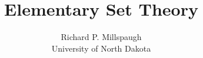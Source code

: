 \documentclass[12pt]{book}
\title{Elementary Set Theory}
\author{Richard P. Millspaugh\\University of North Dakota}
\date{}
\theoremstyle{plain}
\theoremstyle{definition}
\begin{document}
\frontmatter
\maketitle

\tableofcontents

\mainmatter
 



  



\backmatter
\appendix


\immediate\closeout\ansfile

\cleardoublepage

\printindex
\end{document}
